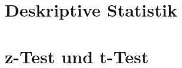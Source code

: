 \documentclass[handout,aspectratio=1610,dvipsnames]{beamer}
\begin{document}
  \section{Deskriptive Statistik}
  \let\woopsi\section\let\section\subsection\let\subsection\subsubsection
  
  \let\subsection\section\let\section\woopsi

  \section{z-Test und t-Test}
  \let\woopsi\section\let\section\subsection\let\subsection\subsubsection
  
  \let\subsection\section\let\section\woopsi
  
\end{document}
